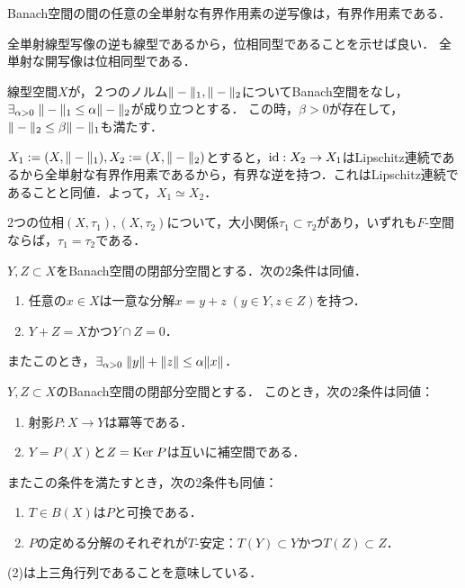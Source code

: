 \documentclass[uplatex,dvipdfmx]{jsreport}
\begin{document}
\begin{corollary}[逆写像定理]\label{cor-inverse-mapping-theorem}
    Banach空間の間の任意の全単射な有界作用素の逆写像は，有界作用素である．
\end{corollary}
\begin{Proof}
    全単射線型写像の逆も線型であるから，位相同型であることを示せば良い．
    全単射な開写像は位相同型である．
\end{Proof}

\begin{corollary}[ノルムが同値であることの十分条件]
    線型空間$X$が，２つのノルム$\|-\|_1,\|-\|_2$についてBanach空間をなし，$\exists_{\alpha>0}\;\|-\|_1\le\alpha\|-\|_2$が成り立つとする．
    この時，$\beta>0$が存在して，$\|-\|_2\le\beta\|-\|_1$も満たす．
\end{corollary}
\begin{Proof}
    $X_1:=(X,\|-\|_1),X_2:=(X,\|-\|_2)$とすると，$\mathrm{id}:X_2\to X_1$はLipschitz連続であるから全単射な有界作用素であるから，有界な逆を持つ．これはLipschitz連続であることと同値．よって，$X_1\simeq X_2$．
\end{Proof}
\begin{remarks}
    2つの位相$(X,\tau_1),(X,\tau_2)$について，大小関係$\tau_1\subset\tau_2$があり，いずれも$F$-空間ならば，$\tau_1=\tau_2$である．
\end{remarks}

\begin{corollary}[Banach空間の補空間分解]
    $Y,Z\subset X$をBanach空間の閉部分空間とする．次の2条件は同値．
    \begin{enumerate}
        \item 任意の$x\in X$は一意な分解$x=y+z\;(y\in Y,z\in Z)$を持つ．
        \item $Y+Z=X$かつ$Y\cap Z=0$．
    \end{enumerate}
    またこのとき，$\exists_{\alpha>0}\;\|y\|+\|z\|\le\alpha\|x\|$．
\end{corollary}

\begin{proposition}[補空間分解と射影]
    $Y,Z\subset X$のBanach空間の閉部分空間とする．
    このとき，次の2条件は同値：
    \begin{enumerate}
        \item 射影$P:X\to Y$は冪等である．
        \item $Y=P(X)$と$Z=\mathrm{Ker}\; P$は互いに補空間である．
    \end{enumerate}
    またこの条件を満たすとき，次の2条件も同値：
    \begin{enumerate}
        \item $T\in B(X)$は$P$と可換である．
        \item $P$の定める分解のそれぞれが$T$-安定：$T(Y)\subset Y$かつ$T(Z)\subset Z$．
    \end{enumerate}
    (2)は上三角行列であることを意味している．
\end{proposition}
\end{document}

